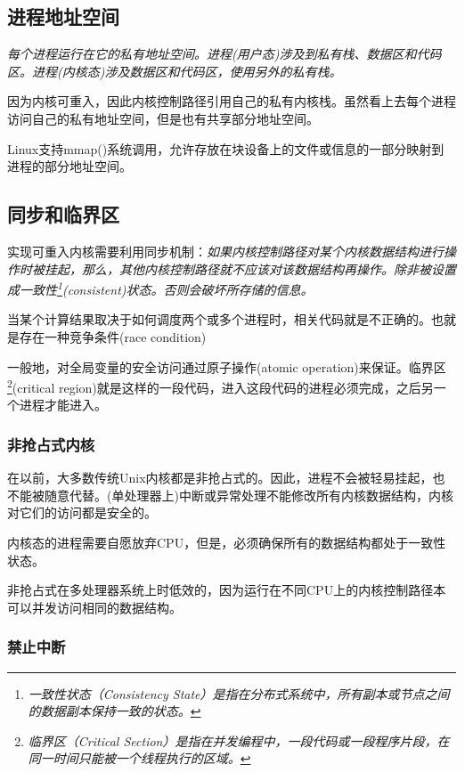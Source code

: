 \subsection{进程地址空间}

    \emph{每个进程运行在它的私有地址空间。进程(用户态)涉及到私有栈、数据区和代码区。进程(内核态)涉及数据区和代码区，使用另外的私有栈。}

    因为内核可重入，因此内核控制路径引用自己的私有内核栈。虽然看上去每个进程访问自己的私有地址空间，但是也有共享部分地址空间。

    Linux支持mmap()系统调用，允许存放在块设备上的文件或信息的一部分映射到进程的部分地址空间。

\subsection{同步和临界区}

    实现可重入内核需要利用同步机制：\emph{如果内核控制路径对某个内核数据结构进行操作时被挂起，那么，其他内核控制路径就不应该对该数据结构再操作。除非被设置成一致性\footnote[1]{\emph{一致性状态（Consistency State）是指在分布式系统中，所有副本或节点之间的数据副本保持一致的状态。}}(consistent)状态。否则会破坏所存储的信息。}

    当某个计算结果取决于如何调度两个或多个进程时，相关代码就是不正确的。也就是存在一种竞争条件(race condition)

    一般地，对全局变量的安全访问通过原子操作(atomic operation)来保证。临界区\footnote[2]{\emph{临界区（Critical Section）是指在并发编程中，一段代码或一段程序片段，在同一时间只能被一个线程执行的区域。}}(critical region)就是这样的一段代码，进入这段代码的进程必须完成，之后另一个进程才能进入。

\subsubsection{非抢占式内核}

    在以前，大多数传统Unix内核都是非抢占式的。因此，进程不会被轻易挂起，也不能被随意代替。(单处理器上)中断或异常处理不能修改所有内核数据结构，内核对它们的访问都是安全的。

    内核态的进程需要自愿放弃CPU，但是，必须确保所有的数据结构都处于一致性状态。

    非抢占式在多处理器系统上时低效的，因为运行在不同CPU上的内核控制路径本可以并发访问相同的数据结构。

\subsubsection{禁止中断}

